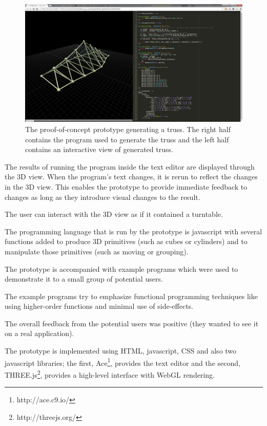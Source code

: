 \documentclass{./llncs2e/llncs}
\begin{document}
	\begin{figure}
	  \centering
	  \includegraphics[width=1.0\textwidth]{img/proto_3d_p_editor}
	    \caption{The proof-of-concept prototype generating a truss. The right half contains the program used to generate the truss and the left half contains an interactive view of generated truss.}
	  \label{fig:proto:3d:p:editor}
	\end{figure} 

	The results of running the program inside the text editor are displayed through the 3D view. 
	When the program's text changes, it is rerun to reflect the changes in the 3D view. 
	This enables the prototype to provide immediate feedback to changes as long as they introduce visual changes to the result.

	The user can interact with the 3D view as if it contained a turntable.

	The programming language that is run by the prototype is javascript with several functions added to produce 3D primitives (such as cubes or cylinders) and to manipulate those primitives (such as moving or grouping).

	The prototype is accompanied with example programs which were used to demonstrate it to a small group of potential users.

	The example programs try to emphasize functional programming techniques like using higher-order functions and minimal use of side-effects.

	The overall feedback from the potential users was positive (they wanted to see it on a real application).

	The prototype is implemented using HTML, javascript, CSS and also two javascript libraries; the first, Ace\footnote{http://ace.c9.io/}, provides the text editor and the second, THREE.js\footnote{http://threejs.org/}, provides a high-level interface with WebGL rendering.
\end{document}
